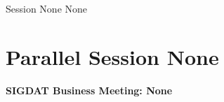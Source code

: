 \clearpage
{}
\begin{ThreeSessionOverview}{Session None}{\daydateyear}
  {None}
\end{ThreeSessionOverview}

\newpage
\section*{Parallel Session None}
{\bfseries\large SIGDAT Business Meeting: None}\\
\TrackALoc\hfill\sessionchair{}{}
\clearpage


